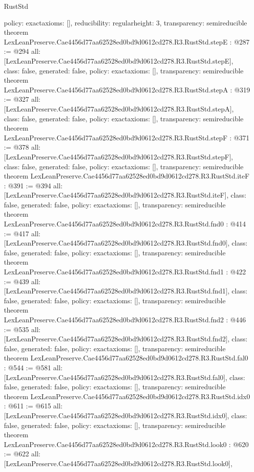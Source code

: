 \begin{lexlean}{RustStd}
\begin{coremodule}
{  policy: exact{axioms: []},
  reducibility: regular{height: 3},
  transparency: semireducible
}
theorem LexLeanPreserve.Cae4456d77aa62528ed0bd9d0612cd278.R3.RustStd.stepE : @287 := @294 {
  all: [LexLeanPreserve.Cae4456d77aa62528ed0bd9d0612cd278.R3.RustStd.stepE],
  class: false,
  generated: false,
  policy: exact{axioms: []},
  transparency: semireducible
}
theorem LexLeanPreserve.Cae4456d77aa62528ed0bd9d0612cd278.R3.RustStd.stepA : @319 := @327 {
  all: [LexLeanPreserve.Cae4456d77aa62528ed0bd9d0612cd278.R3.RustStd.stepA],
  class: false,
  generated: false,
  policy: exact{axioms: []},
  transparency: semireducible
}
theorem LexLeanPreserve.Cae4456d77aa62528ed0bd9d0612cd278.R3.RustStd.stepF : @371 := @378 {
  all: [LexLeanPreserve.Cae4456d77aa62528ed0bd9d0612cd278.R3.RustStd.stepF],
  class: false,
  generated: false,
  policy: exact{axioms: []},
  transparency: semireducible
}
theorem LexLeanPreserve.Cae4456d77aa62528ed0bd9d0612cd278.R3.RustStd.iteF : @391 := @394 {
  all: [LexLeanPreserve.Cae4456d77aa62528ed0bd9d0612cd278.R3.RustStd.iteF],
  class: false,
  generated: false,
  policy: exact{axioms: []},
  transparency: semireducible
}
theorem LexLeanPreserve.Cae4456d77aa62528ed0bd9d0612cd278.R3.RustStd.fnd0 : @414 := @417 {
  all: [LexLeanPreserve.Cae4456d77aa62528ed0bd9d0612cd278.R3.RustStd.fnd0],
  class: false,
  generated: false,
  policy: exact{axioms: []},
  transparency: semireducible
}
theorem LexLeanPreserve.Cae4456d77aa62528ed0bd9d0612cd278.R3.RustStd.fnd1 : @422 := @439 {
  all: [LexLeanPreserve.Cae4456d77aa62528ed0bd9d0612cd278.R3.RustStd.fnd1],
  class: false,
  generated: false,
  policy: exact{axioms: []},
  transparency: semireducible
}
theorem LexLeanPreserve.Cae4456d77aa62528ed0bd9d0612cd278.R3.RustStd.fnd2 : @446 := @535 {
  all: [LexLeanPreserve.Cae4456d77aa62528ed0bd9d0612cd278.R3.RustStd.fnd2],
  class: false,
  generated: false,
  policy: exact{axioms: []},
  transparency: semireducible
}
theorem LexLeanPreserve.Cae4456d77aa62528ed0bd9d0612cd278.R3.RustStd.fal0 : @544 := @581 {
  all: [LexLeanPreserve.Cae4456d77aa62528ed0bd9d0612cd278.R3.RustStd.fal0],
  class: false,
  generated: false,
  policy: exact{axioms: []},
  transparency: semireducible
}
theorem LexLeanPreserve.Cae4456d77aa62528ed0bd9d0612cd278.R3.RustStd.idx0 : @611 := @615 {
  all: [LexLeanPreserve.Cae4456d77aa62528ed0bd9d0612cd278.R3.RustStd.idx0],
  class: false,
  generated: false,
  policy: exact{axioms: []},
  transparency: semireducible
}
theorem LexLeanPreserve.Cae4456d77aa62528ed0bd9d0612cd278.R3.RustStd.look0 : @620 := @622 {
  all: [LexLeanPreserve.Cae4456d77aa62528ed0bd9d0612cd278.R3.RustStd.look0],
}
\end{coremodule}
\end{lexlean}
